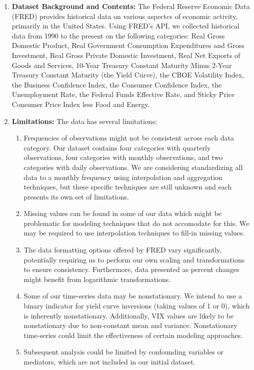 \documentclass[11pt]{article}
\begin{document}
\begin{enumerate}[itemsep=0em,label={(\alph*)}]
\item \textbf{Dataset Background and Contents:} The Federal Reserve Economic Data (FRED) provides historical data on various aspectcs of economic activity, primarily in the United States. Using FRED's API, we collected historical data from 1990 to the present on the following categories: Real Gross Domestic Product, Real Government Consumption Expenditures and Gross Investment, Real Gross Private Domestic Investment, Real Net Exports of Goods and Services, 10-Year Treasury Constant Maturity Minus 2-Year Treasury Constant Maturity (the Yield Curve), the CBOE Volatility Index, the Business Confidence Index, the Consumer Confidence Index, the Unemployment Rate, the Federal Funds Effective Rate, and Sticky Price Consumer Price Index less Food and Energy.
\item \textbf{Limitations:} The data has several limitations:
  \begin{enumerate}[itemsep=0em,label={\roman*.}]
      \item Frequencies of observations might not be consistent across each data category. Our dataset contains four categories with quarterly observations, four categories with monthly observations, and two categories with daily observations. We are considering standardizing all data to a monthly frequency using interpolation and aggregation techniques, but these specific techniques are still unknown and each presents its own set of limitations.
      \item Missing values can be found in some of our data which might be problematic for modeling techniques that do not accomodate for this. We may be required to use interpolation techniques to fill-in missing values. 
      \item The data formatting options offered by FRED vary significantly, potentially requiring us to perform our own scaling and transformations to ensure consistency. Furthermore, data presented as percent changes might benefit from logarithmic transformations.
      \item Some of our time-series data may be nonstationary. We intend to use a binary indicator for yield curve inversions (taking values of 1 or 0), which is inherently nonstationary. Additionally, VIX values are likely to be nonstationary due to non-constant mean and variance. Nonstationary time-series could limit the effectiveness of certain modeling approaches.
      \item Subsequent analysis could be limited by confounding variables or mediators, which are not included in our initial dataset.

\end{enumerate}
\end{enumerate}
\end{document}
